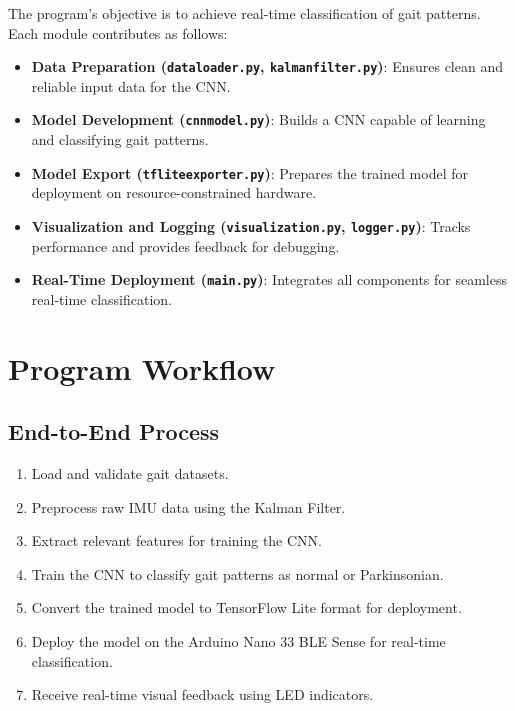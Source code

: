 The program's objective is to achieve real-time classification of gait patterns. Each module contributes as follows:
\begin{itemize}
    \item \textbf{Data Preparation (\texttt{dataloader.py}, \texttt{kalmanfilter.py})}: Ensures clean and reliable input data for the CNN.
    \item \textbf{Model Development (\texttt{cnnmodel.py})}: Builds a CNN capable of learning and classifying gait patterns.
    \item \textbf{Model Export (\texttt{tfliteexporter.py})}: Prepares the trained model for deployment on resource-constrained hardware.
    \item \textbf{Visualization and Logging (\texttt{visualization.py}, \texttt{logger.py})}: Tracks performance and provides feedback for debugging.
    \item \textbf{Real-Time Deployment (\texttt{main.py})}: Integrates all components for seamless real-time classification.
\end{itemize}

\section{Program Workflow}

\subsection{End-to-End Process}
\begin{enumerate}
    \item Load and validate gait datasets.
    \item Preprocess raw IMU data using the Kalman Filter.
    \item Extract relevant features for training the CNN.
    \item Train the CNN to classify gait patterns as normal or Parkinsonian.
    \item Convert the trained model to TensorFlow Lite format for deployment.
    \item Deploy the model on the Arduino Nano 33 BLE Sense for real-time classification.
    \item Receive real-time visual feedback using LED indicators.
\end{enumerate}


